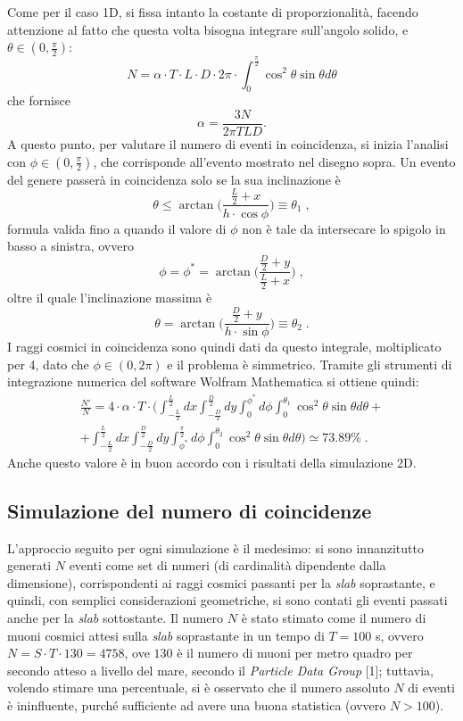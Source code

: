 Come per il caso 1D, si fissa intanto la costante di proporzionalità, facendo attenzione al fatto che questa volta bisogna integrare sull'angolo solido, e $\theta\in(0,\frac{\pi}{2})$: 
$$N = \alpha \cdot T \cdot L \cdot D \cdot 2\pi \cdot \int_{0}^{\frac{\pi}{2}} \cos^2\theta  \sin\theta d\theta$$
che fornisce 
$$\alpha = \frac{3N}{2\pi TLD}.$$ 
A questo punto, per valutare il numero di eventi in coincidenza, si inizia l'analisi con $\phi\in(0, \frac{\pi}{2})$, che corrisponde all'evento mostrato nel disegno sopra. Un evento del genere passerà in coincidenza solo se la sua inclinazione è $$\theta \leq \arctan \bigg(\frac{\frac{L}{2}+x}{h\cdot \cos\phi}\bigg) \equiv \theta_1\;,$$ formula valida fino a quando il valore di $\phi$ non è tale da intersecare lo spigolo in basso a sinistra, ovvero $$\phi = \phi^{*} = \arctan \bigg(\frac{\frac{D}{2}+y}{\frac{L}{2}+x}\bigg)\;,$$ oltre il quale l'inclinazione massima è $$\theta = \arctan \bigg(\frac{\frac{D}{2}+y}{h\cdot \sin\phi}\bigg)  \equiv \theta_2\;.$$I raggi cosmici in coincidenza sono quindi dati da questo integrale, moltiplicato per 4, dato che $\phi\in(0, 2\pi)$ e il problema è simmetrico. Tramite gli strumenti di integrazione numerica del software Wolfram Mathematica si ottiene quindi:
\begin{multline*}
\frac{N'}{N}=4\cdot \alpha \cdot T\cdot \bigg( \int_{-\frac{L}{2}}^{\frac{L}{2}} dx \int_{-\frac{D}{2}}^{\frac{D}{2}} dy \int_0^{\phi^{*}} d\phi \int_0^{\theta_1} \cos^2\theta \sin\theta d\theta +\\
+ \int_{-\frac{L}{2}}^{\frac{L}{2}} dx \int_{-\frac{D}{2}}^{\frac{D}{2}} dy \int_{\phi^{*}}^{\frac{\pi}{2}} d\phi \int_0^{\theta_2} \cos^2\theta \sin\theta d\theta\bigg)\simeq 73.89 \%\;.
\end{multline*} 
Anche questo valore è in buon accordo con i risultati della simulazione 2D.

\subsection{Simulazione del numero di coincidenze}
L'approccio seguito per ogni simulazione è il medesimo: si sono innanzitutto generati $N$ eventi come set di numeri (di cardinalità dipendente dalla dimensione), corrispondenti ai raggi cosmici passanti per la \emph{slab} soprastante, e quindi, con semplici considerazioni geometriche, si sono contati gli eventi passati anche per la \emph{slab} sottostante. Il numero $N$ è stato stimato come il numero di muoni cosmici attesi sulla \emph{slab} soprastante in un tempo di $T=100$ s, ovvero $N=S\cdot T\cdot 130=4758$, ove $130$ è il numero di muoni per metro quadro per secondo atteso a livello del mare, secondo il \emph{Particle Data Group} [1]; tuttavia, volendo stimare una percentuale, si è osservato che il numero assoluto $N$ di eventi è ininfluente, purché sufficiente ad avere una buona statistica (ovvero $N>100$).

